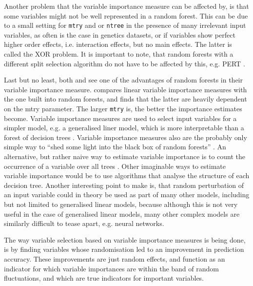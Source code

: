 \documentclass[a4paper,man,12pt,apacite,floatsintext,draftfirst]{apa6} %
\begin{document}
Another problem that the variable importance measure can be affected by,
is that some variables might not be well represented in a random forest.
This can be due to a small setting for \texttt{mtry} and or \texttt{ntree}
in the presence of many irrelevant input variables, as often is the case
in genetics datasets, or if variables show perfect higher order effects,
i.e. interaction effects, but no main effects.
The latter is called the XOR problem.
It is important to note, that random forests with a different split selection
algorithm do not have to be affected by this, e.g. PERT \cite{cutler2001pert}.

Last but no least, both  and
 see one of the advantages of random forests in
their variable importance measure.
\cite{gromping2009variable} compares linear variable importance measures
with the one built into random forests, and finds that the latter are
heavily dependent on the mtry parameter.
The larger \texttt{mtry} is, the better the importance estimates become.
Variable importance measures are used to select input variables for a simpler
model, e.g. a generalised liner model, which is more interpretable than a
forest of decision trees \cite{strobl2009introduction}.
Variable importance measures also are the probably only simple way to
“shed some light into the black box of random forests”
\cite{gromping2009variable}.
An alternative, but rather naive way to estimate variable importance is to count
the occurrence of a variable over all trees \cite{strobl2009introduction}.
Other imaginable ways to estimate variable importance would be to use
algorithms that analyse the structure of each decision tree.
Another interesting point to make is, that random perturbation of an input
variable could in theory be used as part of many other models, including but
not limited to generalised linear models, because although
this is not very useful in the case of generalised linear models,
many other complex models are similarly difficult to tease apart, e.g.
neural networks.

The way variable selection based on variable importance measures is
being done, is by finding variables whose randomisation led to an improvement
in prediction accuracy.
These improvements are just random effects, and function as an indicator
for which variable importances are within the band of random fluctuations,
and which are true indicators for important variables.
\end{document}
